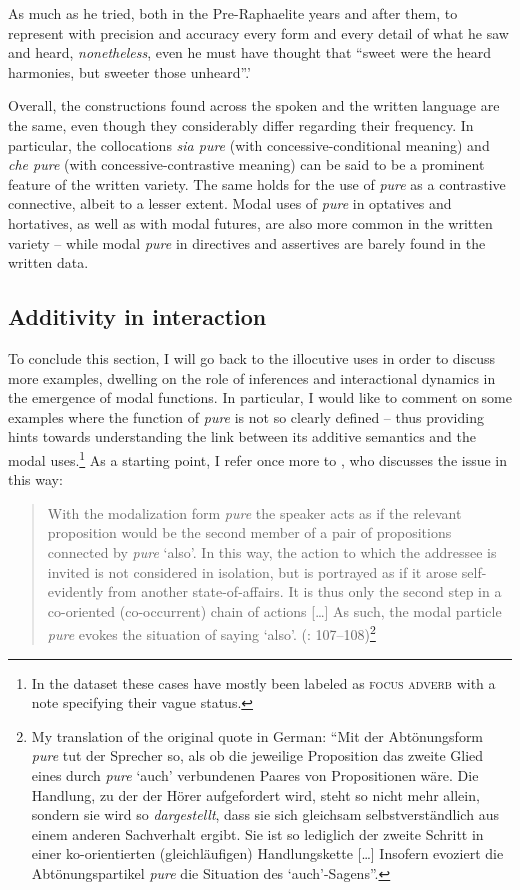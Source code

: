 As much as he tried, both in the Pre-Raphaelite years and after them, to represent with precision and accuracy every form and every detail of what he saw and heard, \textit{nonetheless}, even he must have thought that “sweet were the heard harmonies, but sweeter those unheard”.’
    \z

Overall, the constructions found across the spoken and the written language are the same, even though they considerably differ regarding their frequency. In particular, the collocations \textit{sia pure} (with concessive-conditional meaning) and \textit{che pure} (with concessive-contrastive meaning) can be said to be a prominent feature of the written variety. The same holds for the use of \textit{pure} as a contrastive connective, albeit to a lesser extent. Modal uses of \textit{pure} in optatives and hortatives, as well as with modal futures, are also more common in the written variety – while modal \textit{pure} in directives and assertives are barely found in the written data.

\subsection{Additivity in interaction}
\hypertarget{Toc124860655}{}
To conclude this section, I will go back to the illocutive uses in order to discuss more examples, dwelling on the role of inferences and interactional dynamics in the emergence of modal functions. In particular, I would like to comment on some examples where the function of \textit{pure} is not so clearly defined – thus providing hints towards understanding the link between its additive semantics and the modal uses.\footnote{In the dataset these cases have mostly been labeled as \textsc{focus} \textsc{adverb} with a note specifying their vague status.}  As a starting point, I refer once more to \citet{Waltereit2006}, who discusses the issue in this way:

\begin{quote}
With the modalization form \textit{pure} the speaker acts as if the relevant proposition would be the second member of a pair of propositions connected by \textit{pure} ‘also’. In this way, the action to which the addressee is invited is not considered in isolation, but is portrayed as if it arose self-evidently from another state-of-affairs. It is thus only the second step in a co-oriented (co-occurrent) chain of actions […] As such, the modal particle \textit{pure} evokes the situation of saying ‘also’. (\citealt{Waltereit2006}: 107–108)\footnote{My translation of the original quote in German: “Mit der Abtönungsform \textit{pure} tut der Sprecher so, als ob die jeweilige Proposition das zweite Glied eines durch \textit{pure} ‘auch’ verbundenen Paares von Propositionen wäre. Die Handlung, zu der der Hörer aufgefordert wird, steht so nicht mehr allein, sondern sie wird so \textit{dargestellt}, dass sie sich gleichsam selbstverständlich aus einem anderen Sachverhalt ergibt. Sie ist so lediglich der zweite Schritt in einer ko-orientierten (gleichläufigen) Handlungskette […] Insofern evoziert die Abtönungspartikel \textit{pure} die Situation des ‘auch’-Sagens”.}
\end{quote}

